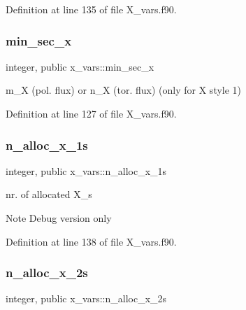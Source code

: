Definition at line 135 of file X\+\_\+vars.\+f90.

\mbox{\label{namespacex__vars_a0d63825aabc4c71623c6ea7ffe033949}} 
\subsubsection{\texorpdfstring{min\+\_\+sec\+\_\+x}{min\_sec\_x}}
{\footnotesize\ttfamily integer, public x\+\_\+vars\+::min\+\_\+sec\+\_\+x}



{\ttfamily m\+\_\+X} (pol. flux) or {\ttfamily n\+\_\+X} (tor. flux) (only for {\ttfamily X} style 1) 



Definition at line 127 of file X\+\_\+vars.\+f90.

\mbox{\label{namespacex__vars_af565ad5c65071b130e69d528aa6faf1d}} 
\subsubsection{\texorpdfstring{n\+\_\+alloc\+\_\+x\+\_\+1s}{n\_alloc\_x\_1s}}
{\footnotesize\ttfamily integer, public x\+\_\+vars\+::n\+\_\+alloc\+\_\+x\+\_\+1s}



nr. of allocated {\ttfamily X\+\_}\textquotesingle{}s 

\begin{DoxyNote}{Note}
Debug version only 
\end{DoxyNote}


Definition at line 138 of file X\+\_\+vars.\+f90.

\mbox{\label{namespacex__vars_add0d925899063fbe0c4ff05d21f35a23}} 
\subsubsection{\texorpdfstring{n\+\_\+alloc\+\_\+x\+\_\+2s}{n\_alloc\_x\_2s}}
{\footnotesize\ttfamily integer, public x\+\_\+vars\+::n\+\_\+alloc\+\_\+x\+\_\+2s}



